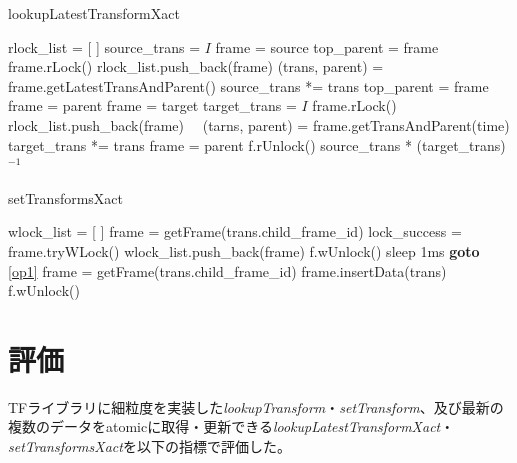 \documentclass[a4paper]{jreport}	%
\begin{document}
\begin{algorithm}
  \caption{lookupLatestTransformXact}\label{algo:lookupLatestTransformXact}
\begin{algorithmic}[1]
	\State rlock\_list = [ ]
	\State source\_trans = $I$
	\State frame = source
	\State top\_parent = frame
   \State frame.rLock()
	\State rlock\_list.push\_back(frame)  \label{code:lookupXact-add}
	\State (trans, parent) = frame.getLatestTransAndParent() 
	\State source\_trans *= trans
	\State top\_parent = frame
	\State frame = parent
	\EndWhile
	\State frame = target
	\State target\_trans = $I$
   \State frame.rLock()	
	\State rlock\_list.push\_back(frame)　
	\State (tarns, parent) = frame.getTransAndParent(time)
	\State target\_trans *= trans
	\State frame = parent
	\EndWhile
    \label{code:lookupXact-unlockall}  
   \State f.rUnlock()
   \EndFor	
	\State \Return source\_trans * (target\_trans)$^{-1}$
	\EndFunction
\end{algorithmic}
\end{algorithm}


\begin{algorithm}
\caption{setTransformsXact}\label{algo:setTransformsXact}
\begin{algorithmic}[1]
	\State wlock\_list = [ ] \label{op1}
	\State frame = getFrame(trans.child\_frame\_id)
	\State lock\_success = frame.tryWLock()  \label{code:setXact-trylock}
	\State wlock\_list.push\_back(frame)
	\Else
	 \label{code:setXact-unlockall}  
   \State f.wUnlock()
   \EndFor
	\State sleep 1ms 
	\State \textbf{goto} \ref{op1} 
	\EndIf
	\EndFor
	 
	\State frame = getFrame(trans.child\_frame\_id)
	\State frame.insertData(trans)
	\EndFor
	 
   \State f.wUnlock()
   \EndFor
	\EndProcedure
\end{algorithmic}
\end{algorithm}

\chapter{評価}
TFライブラリに細粒度を実装した\textit{lookupTransform}・\textit{setTransform}、及び最新の複数のデータをatomicに取得・更新できる\textit{lookupLatestTransformXact}・\textit{setTransformsXact}を以下の指標で評価した。
\end{document}
